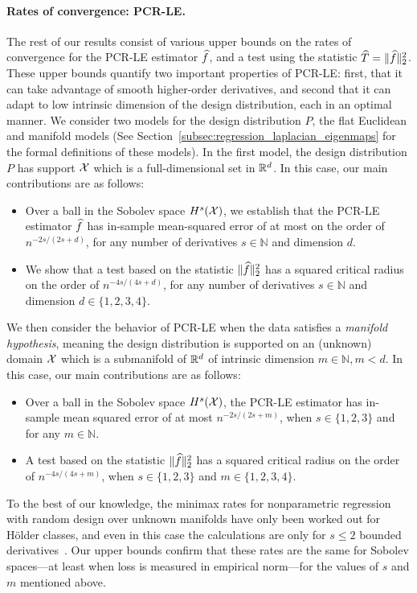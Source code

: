 \paragraph{Rates of convergence: PCR-LE.}
The rest of our results consist of various upper bounds on the rates of convergence for the PCR-LE estimator $\widehat{f}$, and a test using the statistic $\widehat{T} = \|\widehat{f}\|_2^2$. These upper bounds quantify two important properties of PCR-LE: first, that it can take advantage of smooth higher-order derivatives, and second that it can adapt to low intrinsic dimension of the design distribution, each in an optimal manner. We consider two models for the design distribution $P$, the flat Euclidean and manifold models (See Section~\ref{subsec:regression_laplacian_eigenmaps} for the formal definitions of these models). In the first model, the design distribution $P$ has support $\mathcal{X}$ which is a full-dimensional set in $\mathbb{R}^d$. In this case, our main contributions are as follows:
\begin{itemize}
	\item  Over a ball in the Sobolev space $H^{s}(\mathcal{X})$, we establish that the PCR-LE estimator $\widehat{f}$ has in-sample mean-squared error of at most on the order of $n^{-2s/(2s + d)}$, for any number of derivatives $s \in \mathbb{N}$ and dimension $d$. 
	\item We show that a test based on the statistic $\|\widehat{f}\|_2^2$ has a squared critical radius on the order of $n^{-4s/(4s + d)}$, for any number of derivatives $s \in \mathbb{N}$ and dimension $d \in \{1,2,3,4\}$. 
\end{itemize}
We then consider the behavior of PCR-LE when the data satisfies a \emph{manifold hypothesis}, meaning the design distribution is supported on an (unknown) domain $\mathcal{X}$ which is a submanifold of $\mathbb{R}^d$ of intrinsic dimension $m \in \mathbb{N}, m < d$. In this case, our main contributions are as follows:
\begin{itemize}
	\item Over a ball in the Sobolev space $H^{s}(\mathcal{X})$, the PCR-LE estimator has in-sample mean squared error of at most $n^{-2s/(2s + m)}$, when $s \in \{1,2,3\}$ and for any $m \in \mathbb{N}$. 
	\item A test based on the statistic $\|\widehat{f}\|_2^2$ has a squared critical radius on the order of $n^{-4s/(4s + m)}$, when $s \in \{1,2,3\}$ and $m \in \{1,2,3,4\}$.
\end{itemize}
To the best of our knowledge, the minimax rates for nonparametric regression with random design over unknown manifolds have only been worked out for H\"{o}lder classes, and even in this case the calculations are only for $s \leq 2$ bounded derivatives~\citep{bickel2007,yang2016}. Our upper bounds confirm that these rates are the same for Sobolev spaces---at least when loss is measured in empirical norm---for the values of $s$ and $m$ mentioned above.

